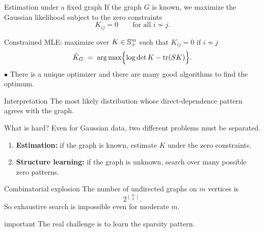 \documentclass[dvipsnames,aspectratio=169,handout]{beamer}
\begin{document}
\begin{frame}{Estimation under a fixed graph}
If the graph $G$ is known, we maximize the Gaussian likelihood subject to the zero constraints
\[
K_{ij}=0 \qquad \text{for all } i\not\sim j.
\]

\begin{block}{Constrained MLE: maximize over $K\in \S^m_+$ such that $K_{ij}=0\text{ if }i\not\sim j$}
\[
\hat K_G
\;=\;
\arg\max
\Bigl\{\log\det K-\tr(SK)\Bigr\}.
\]
$\bullet$ There is a unique optimizer and there are many good algorithms to find the optimum.
\end{block}

\begin{alertblock}{Interpretation}
The most likely distribution whose direct-dependence pattern agrees with the graph.
\end{alertblock}
\end{frame}

\begin{frame}{What is hard?}
Even for Gaussian data, two different problems must be separated.

\begin{enumerate}
    \item \textbf{Estimation:} if the graph is known, estimate $K$ under the zero constraints.
    \item \textbf{Structure learning:} if the graph is unknown, search over many possible zero patterns.
\end{enumerate}

\begin{alertblock}{Combinatorial explosion}
The number of undirected graphs on $m$ vertices is
\[
2^{\binom{m}{2}}.
\]
So exhaustive search is impossible even for moderate $m$.
\end{alertblock}

\begin{beamercolorbox}[wd=\textwidth,sep=7pt,center,rounded=true,shadow=true]{important}
The real challenge is to learn the sparsity pattern.
\end{beamercolorbox}
\end{frame}

%
\end{document}
